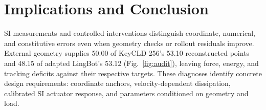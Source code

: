 \documentclass[10pt,twocolumn,letterpaper]{article}
\begin{document}
\section{Implications and Conclusion}
\label{sec:discussion}
SI measurements and controlled interventions distinguish coordinate, numerical, and constitutive errors even when geometry checks or rollout residuals improve. External geometry supplies 50.00 of KeyCLD 256's 53.10 reconstructed points and 48.15 of adapted LingBot's 53.12 (Fig.~\ref{fig:audit}), leaving force, energy, and tracking deficits against their respective targets. These diagnoses identify concrete design requirements: coordinate anchors, velocity-dependent dissipation, calibrated SI actuator response, and parameters conditioned on geometry and load.
\par
\label{maintextend}
\clearfullpage
{\small


}
\clearpage

\end{document}
